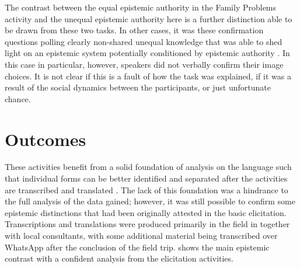 The contrast between the equal epistemic authority in the Family Problems activity and the unequal epistemic authority here is a further distinction able to be drawn from these two tasks. In other cases, it was these confirmation questions polling clearly non-shared unequal knowledge that was able to shed light on an epistemic system potentially conditioned by epistemic authority \cite{Bodnaruk2023}. In this case in particular, however, speakers did not verbally confirm their image choices. It is not clear if this is a fault of how the task was explained, if it was a result of the social dynamics between the participants, or just unfortunate chance.

\section{Outcomes}
These activities benefit from a solid foundation of analysis on the language such that individual forms can be better identified and separated after the activities are transcribed and translated \cite{Bodnaruk2023}. The lack of this foundation was a hindrance to the full analysis of the data gained; however, it was still possible to confirm some epistemic distinctions that had been originally attested in the basic elicitation. Transcriptions and translations were produced primarily in the field in  together with local consultants, with some additional material being transcribed over WhatsApp after the conclusion of the field trip.  shows the main epistemic contrast with a confident analysis from the elicitation activities.

